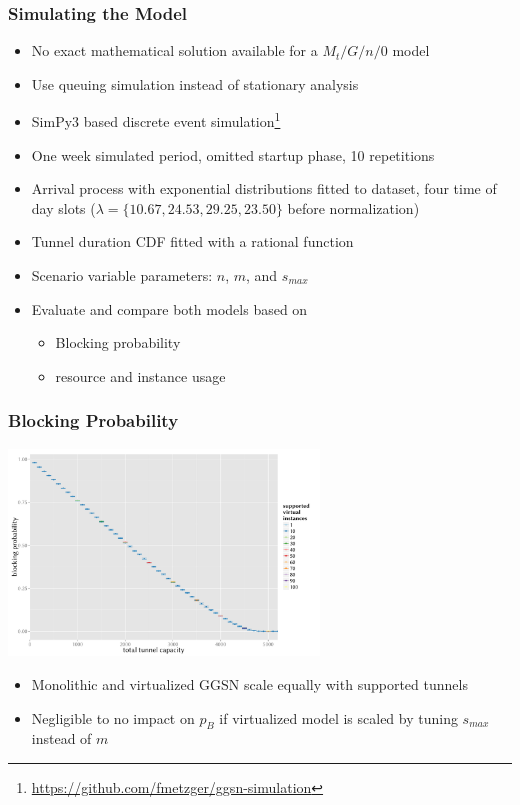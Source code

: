 \documentclass{beamer}
\begin{document}
\begin{frame}
	\frametitle{Simulating the Model}

	\begin{itemize}
		\item No exact mathematical solution available for a $M_t/G/n/0$ model
		\item Use queuing simulation instead of stationary analysis
		\item SimPy3 based discrete event simulation\footnote{\url{https://github.com/fmetzger/ggsn-simulation}}
		\item One week simulated period, omitted startup phase, 10 repetitions
		\item Arrival process with exponential distributions fitted to dataset, four time of day slots ($\lambda=\{10.67,24.53,29.25,23.50\}$ before normalization)
		\item Tunnel duration CDF fitted with a rational function
		\item Scenario variable parameters: $n$, $m$, and $s_{max}$
		\item Evaluate and compare both models based on
		\begin{itemize}
			\item Blocking probability
			\item resource and instance usage
		\end{itemize}
	\end{itemize}

\end{frame}

\begin{frame}
	\frametitle{Blocking Probability}

	\begin{center}
		\includegraphics[height=5.5cm]{../../chapters/04-mobilenets/images/R-virtualized-blocking.pdf}
	\end{center}

	\begin{itemize}
		\item Monolithic and virtualized GGSN scale equally with supported tunnels
		\item Negligible to no impact on $p_B$ if virtualized model is scaled by tuning $s_{max}$ instead of $m$
	\end{itemize}
\end{frame}
\end{document}
